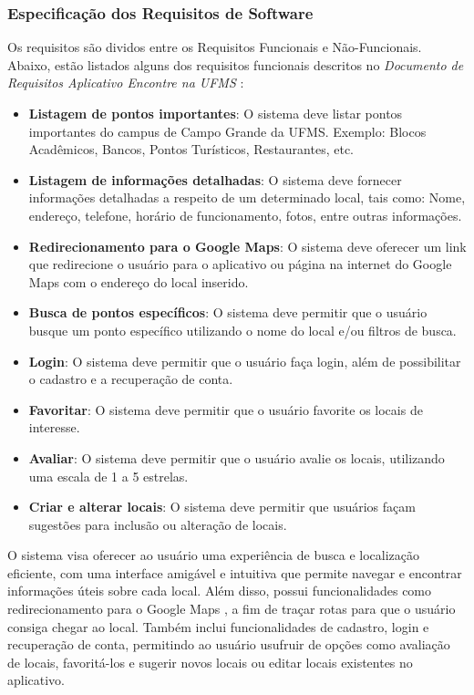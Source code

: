 \subsubsection{Especificação dos Requisitos de Software}

    Os requisitos são dividos entre os Requisitos Funcionais e Não-Funcionais. Abaixo, estão listados alguns dos requisitos funcionais descritos no \textit{Documento de Requisitos Aplicativo Encontre na UFMS} \cite{documentoRequisitosAplicativoEncontreNaUFMS}:
    
    \begin{itemize}
      \item \textbf{Listagem de pontos importantes}: O sistema deve listar pontos importantes do campus de Campo Grande da UFMS. Exemplo: Blocos Acadêmicos, Bancos, Pontos Turísticos, Restaurantes, etc.
      \item \textbf{Listagem de informações detalhadas}: O sistema deve fornecer informações detalhadas a respeito de um determinado local, tais como: Nome, endereço, telefone, horário de funcionamento, fotos, entre outras informações.
      \item \textbf{Redirecionamento para o Google Maps}:  O sistema deve oferecer um link que redirecione o usuário para o aplicativo ou página na internet do Google Maps \cite{maps2005} com o endereço do local inserido.
      \item \textbf{Busca de pontos específicos}: O sistema deve permitir que o usuário busque um ponto específico utilizando o nome do local e/ou filtros de busca.
      \item \textbf{Login}: O sistema deve permitir que o usuário faça login, além de possibilitar o cadastro e a recuperação de conta.
      \item \textbf{Favoritar}:  O sistema deve permitir que o usuário favorite os locais de interesse.
      \item \textbf{Avaliar}:  O sistema deve permitir que o usuário avalie os locais, utilizando uma escala de 1 a 5 estrelas.
      \item \textbf{Criar e alterar locais}: O sistema deve permitir que usuários façam sugestões para inclusão ou alteração de locais.
    \end{itemize}
    
    O sistema visa oferecer ao usuário uma experiência de busca e localização eficiente, com uma interface amigável e intuitiva que permite navegar e encontrar informações úteis sobre cada local. Além disso, possui funcionalidades como redirecionamento para o Google Maps \cite{maps2005}, a fim de traçar rotas para que o usuário consiga chegar ao local. Também inclui funcionalidades de cadastro, login e recuperação de conta, permitindo ao usuário usufruir de opções como avaliação de locais, favoritá-los e sugerir novos locais ou editar locais existentes no aplicativo.
    
